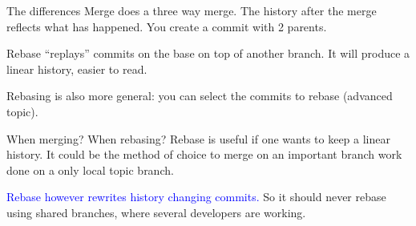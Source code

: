 \documentclass{beamer}
\begin{document}
\begin{frame}{The differences}
Merge does a three way merge. The history after the merge reflects what has happened. You create a commit with \alert{2 parents}.
\medskip

Rebase ``replays'' commits on the base on top of another branch. It will produce a \alert{linear history}, easier to read.

Rebasing is also more general: you can select the commits to rebase (advanced topic).
\end{frame}

\begin{frame}{When merging? When rebasing?}
Rebase is useful if one wants to keep a linear history. It could be the method of choice to merge on an important branch work done on a \alert{only local} topic branch.

\textcolor{blue}{Rebase however rewrites history changing commits.} So 
\alert{it should never rebase using shared branches, where several developers are working.}
\end{frame}
\end{document}
